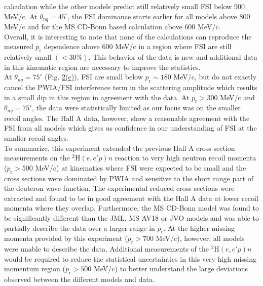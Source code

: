 \documentclass[aps,prl,twocolumn,showpacs,superscriptaddress,groupedaddress,nofootinbib]{revtex4-2}  %
\begin{document}
calculation while the other models predict still relatively small FSI below 900 MeV/c.
At $\theta_{nq}=45^{\circ}$, the FSI dominance starts earlier for all models above 800 MeV/c and for the MS CD-Bonn based calculation above 600 MeV/c. \\
\indent Overall, it is interesting to note that none of the calculations can reproduce the measured $p_{\mathrm{r}}$ dependence above 600 MeV/c in a
region where FSI are still relatively small $(<30\%)$. This behavior of the data is new and additional data in this kinematic region are necessary
to improve the statistics. \\
\indent At $\theta_{nq}=75^{\circ}$ (Fig. \hyperref[fig:fig2]{2(c)}), FSI are small below $p_{\mathrm{r}}\sim180$ MeV/c, but do not exactly cancel the PWIA/FSI interference term in the scattering amplitude which results in a small dip in this region in agreement with the data.
At $p_{\mathrm{r}}>300$ MeV/c and $\theta_{nq}=75^{\circ}$, the data were statistically limited as our focus was on the smaller recoil angles. The Hall A data, however, show a reasonable agreement with the FSI from all models which gives us confidence in our understanding
of FSI at the smaller recoil angles. \\
\indent To summarize, this experiment extended the previous Hall A cross section measurements on the $^{2}\mathrm{H}(e,e'p)n$ reaction to 
very high neutron recoil momenta ($p_{\mathrm{r}}>500$ MeV/c) at kinematics where FSI were expected to be small and the cross sections were dominated by PWIA and sensitive to the
short range part of the deuteron wave function. The experimental reduced cross sections were extracted and found to be in good agreement with the Hall A data at lower recoil momenta where they overlap.
Furthermore, the MS CD-Bonn model was found to be significantly different than the JML, MS AV18 or JVO models and was able to partially describe the data over a larger range in $p_{\mathrm{r}}$.
At the higher missing momenta provided by this experiment ($p_{\mathrm{r}}>700$ MeV/c), however, all models were unable to describe the data. 
Additional measurements of the $^{2}\mathrm{H}(e,e'p)n$ would be required to reduce the statistical uncertainties in this very high missing
momentum region ($p_{\mathrm{r}}>500$ MeV/c) to better understand the large deviations observed between the different models and data.\\
\end{document}
